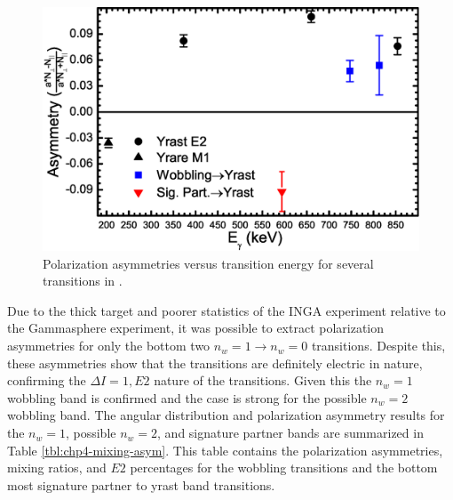 \begin{figure}[t!]
\centerline{\includegraphics[width=\textwidth]{./img/c4/AsymPlot.eps}}
	\caption{Polarization asymmetries versus transition energy for several transitions in \pr{}.\label{fig:chp4-asyms}}
\end{figure}

Due to the thick target and poorer statistics of the INGA experiment relative to the Gammasphere experiment, it was possible to extract polarization asymmetries for only the bottom two $n_w=1\rightarrow{}n_w=0$ transitions. Despite this, these asymmetries show that the transitions are definitely electric in nature, confirming the $\Delta{}I=1, E2$ nature of the transitions. Given this the $n_w=1$ wobbling band is confirmed and the case is strong for the possible $n_w=2$ wobbling band. The angular distribution and polarization asymmetry results for the $n_w=1$, possible $n_w=2$, and signature partner bands are summarized in Table \ref{tbl:chp4-mixing-asym}. This table contains the polarization asymmetries, mixing ratios, and $E2$ percentages for the wobbling transitions and the bottom most signature partner to yrast band transitions. 

